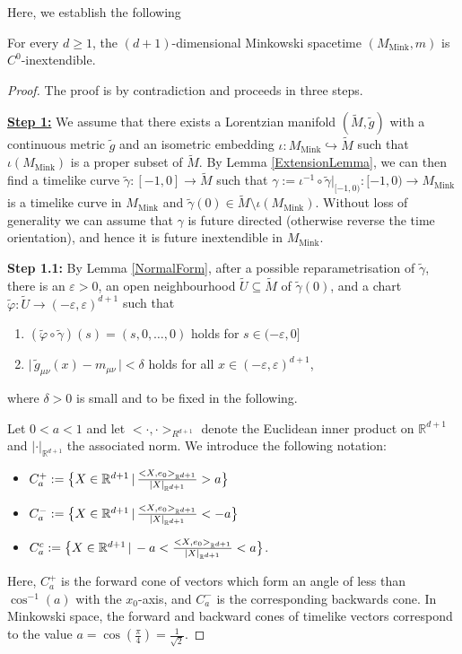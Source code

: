 \documentclass[reqno]{article}
\newcommand{\R}{\mathbb{R}}
\newcommand{\ed}{(-\varepsilon, \varepsilon)^{d+1}}
\newcommand{\Mmink}{M_{\mathrm{Mink}}}
\begin{document}
Here, we establish the following 

\begin{theorem}\label{schwthm:MinkInex}
\label{MinkInex}
For every $d \geq 1$, the $(d+1)$-dimensional Minkowski spacetime $(\Mmink, m)$ is $C^0$-inextendible.
\end{theorem}

\begin{proof}
The proof is by contradiction and proceeds in three steps. 
\vspace*{2mm}

\underline{\textbf{Step 1:}}
We assume that there exists a Lorentzian manifold $(\tilde{M}, \tilde{g})$ with a continuous metric $\tilde{g}$ and an isometric embedding $\iota : \Mmink \hookrightarrow \tilde{M}$ such that $\iota(\Mmink)$ is a proper subset of $\tilde{M}$. By Lemma \ref{ExtensionLemma}, we can then find a timelike curve $\tilde{\gamma} : [-1,0] \to \tilde{M}$ such that $\gamma := \iota^{-1} \circ \tilde{\gamma}|_{[-1,0)} : [-1,0) \to \Mmink$ is a timelike curve in $\Mmink$ and $\tilde{\gamma}(0) \in \tilde{M} \setminus \iota(\Mmink)$. Without loss of generality we can assume that $\gamma$ is future directed (otherwise reverse the time orientation), and hence it is future inextendible in $\Mmink$. 
\vspace*{2mm}

\textbf{Step 1.1:}
By Lemma \ref{NormalForm}, after a possible reparametrisation of $\tilde{\gamma}$, there is an $\varepsilon >0$, an open neighbourhood $\tilde{U} \subseteq \tilde{M}$ of $\tilde{\gamma}(0)$, and a chart $\tilde{\varphi} : \tilde{U} \to \ed$ such that
\begin{enumerate}
\item $(\tilde{\varphi} \circ \tilde{\gamma}) (s) = (s,0, \ldots, 0) $ holds for $s \in (-\varepsilon, 0]$
\item $\big| \,\tilde{g}_{\mu \nu}(x) - m_{\mu \nu} \,\big| < \delta $ holds for all $x \in (-\varepsilon , \varepsilon)^{d+1}$\;,
\end{enumerate}
where $\delta >0$ is small and to be fixed in the following.

Let $ 0 < a < 1$ and let $< \cdot, \cdot>_{R^{d+1}}$ denote the Euclidean inner product on $\R^{d+1}$ and $| \cdot |_{\R^{d+1}}$ the associated norm. We introduce the following notation: 
\begin{itemize}
\item $C^+_a := \big{\{} X \in \R^{d+1} \, | \, \frac{<X,e_0>_{\R^{d+1}}}{|X|_{\R^{d+1}}}   > a \big{\}}$
\item $C^-_a := \big{\{} X \in \R^{d+1} \, | \, \frac{<X,e_0>_{\R^{d+1}}}{|X|_{\R^{d+1}}}   < -a \big{\}}$
\item $C^c_a := \big{\{} X \in \R^{d+1} \, | \, -a < \frac{<X,e_0>_{\R^{d+1}}}{|X|_{\R^{d+1}}}   < a \big{\}}$\;.
\end{itemize}
Here, $C^+_a$ is the forward cone of vectors which form an angle of less than $\cos^{-1}(a)$ with the $x_0$-axis, and $C^-_a$ is the corresponding backwards cone. In Minkowski space, the forward and backward cones of timelike vectors correspond to the value $a = \cos(\frac{\pi}{4}) = \frac{1}{\sqrt{2}}$.


\end{proof}
\end{document}
